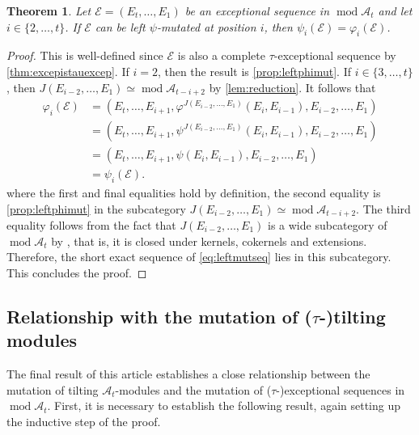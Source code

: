 \documentclass[10pt,twoside, a4paper,reqno]{amsart}
\DeclareMathOperator{\mods}{mod}
\newcommand{\A}{\mathscr{A}}
\newcommand{\Ecal}{\mathcal{E}}
\newtheorem{theorem}{Theorem}[section]
\theoremstyle{definition}
\begin{document}
\begin{theorem}\label{thm:mutthm}
    Let $\Ecal = (E_t, \dots, E_1)$ be an exceptional sequence in $\mods \A_t$ and let $i \in \{2, \dots, t\}$. If $\Ecal$ can be left $\psi$-mutated at position $i$, then $\psi_i(\Ecal) = \varphi_i(\Ecal)$.
\end{theorem}
\begin{proof}
    This is well-defined since $\Ecal$ is also a complete $\tau$-exceptional sequence by \cref{thm:excepistauexcep}. If $i=2$, then the result is \cref{prop:leftphimut}. If $i \in \{3, \dots, t\}$, then $J(E_{i-2}, \dots, E_1) \simeq \mods \A_{t-i+2}$ by \cref{lem:reduction}. It follows that 
    \begin{align*} \varphi_i(\Ecal) &= (E_t, \dots, E_{i+1}, \varphi^{J(E_{i-2}, \dots, E_1)}(E_i, E_{i-1}), E_{i-2}, \dots, E_1) \\
    &= (E_t, \dots, E_{i+1}, \psi^{J(E_{i-2}, \dots, E_1)}(E_i, E_{i-1}), E_{i-2}, \dots, E_1) \\
    &= (E_t, \dots, E_{i+1}, \psi(E_i, E_{i-1}), E_{i-2}, \dots, E_1) \\
    & = \psi_i(\Ecal). \end{align*}
    where the first and final equalities hold by definition, the second equality is \cref{prop:leftphimut} in the subcategory $J(E_{i-2}, \dots, E_1) \simeq \mods \A_{t-i+2}$. The third equality follows from the fact that $J(E_{i-2}, \dots, E_1)$ is a wide subcategory of $\mods \A_t$ by \cite[Cor. 3.25]{BST2019}, that is, it is closed under kernels, cokernels and extensions. Therefore, the short exact sequence of \cref{eq:leftmutseq} lies in this subcategory. This concludes the proof.
\end{proof}


\subsection{Relationship with the mutation of ($\tau$-)tilting modules}

The final result of this article establishes a close relationship between the mutation of tilting $\A_t$-modules and the mutation of ($\tau$-)exceptional sequences in $\mods \A_t$. First, it is necessary to establish the following result, again setting up the inductive step of the proof. 
\end{document}
